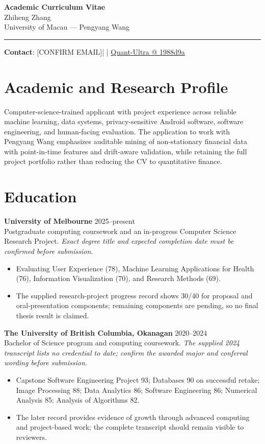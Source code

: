 \documentclass[11pt]{article}
\makeatletter
\newcommand{\ApplicantName}{Zhiheng Zhang}
\newcommand{\ApplicantEmail}{[CONFIRM EMAIL]}
\newcommand{\ApplicantPhone}{[CONFIRM PHONE]}
\newcommand{\ApplicantGitHub}{\href{https://github.com/zhiheng-zhang-Mera/Quant-Ultra/tree/1988d9a8530da91a8158de864d098ea869098923}{Quant-Ultra @ 1988d9a}}
\makeatother
\begin{document}
\begin{center}
{\LARGE\bfseries Academic Curriculum Vitae}\\[0.25em]
{\large \ApplicantName}\\
University of Macau --- Pengyang Wang
\end{center}
\vspace{0.35em}\hrule\vspace{0.65em}

\textbf{Contact}: \ApplicantEmail\quad | \quad \ApplicantPhone\quad | \quad \ApplicantGitHub

\section*{Academic and Research Profile}
Computer-science-trained applicant with project experience across reliable machine learning, data systems, privacy-sensitive Android software, software engineering, and human-facing evaluation. The application to work with Pengyang Wang emphasizes auditable mining of non-stationary financial data with point-in-time features and drift-aware validation, while retaining the full project portfolio rather than reducing the CV to quantitative finance.

\section*{Education}
\textbf{University of Melbourne} \hfill 2025--present\\
Postgraduate computing coursework and an in-progress Computer Science Research Project. \textit{Exact degree title and expected completion date must be confirmed before submission.}
\begin{itemize}
\item Evaluating User Experience (78), Machine Learning Applications for Health (76), Information Visualization (70), and Research Methods (69).
\item The supplied research-project progress record shows 30/40 for proposal and oral-presentation components; remaining components are pending, so no final thesis result is claimed.
\end{itemize}

\textbf{The University of British Columbia, Okanagan} \hfill 2020--2024\\
Bachelor of Science program and computing coursework. \textit{The supplied 2024 transcript lists no credential to date; confirm the awarded major and conferral wording before submission.}
\begin{itemize}
\item Capstone Software Engineering Project 93; Databases 90 on successful retake; Image Processing 88; Data Analytics 86; Software Engineering 86; Numerical Analysis 85; Analysis of Algorithms 82.
\item The later record provides evidence of growth through advanced computing and project-based work; the complete transcript should remain visible to reviewers.
\end{itemize}
\end{document}
